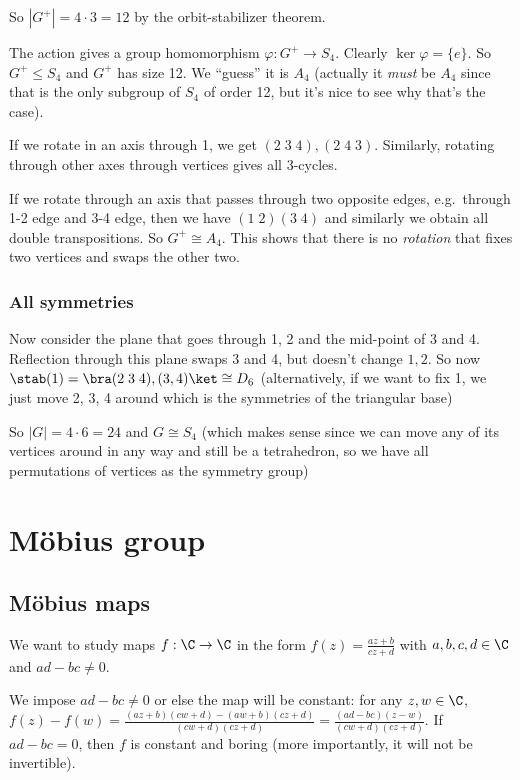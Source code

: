 \documentclass[a4paper]{article}
\begin{document}
So $|G^+| = 4\cdot 3 = 12$ by the orbit-stabilizer theorem.

The action gives a group homomorphism $\varphi: G^+ \to S_4$. Clearly $\ker \varphi = \{e\}$. So $G^+ \leq S_4$ and $G^+$ has size 12. We ``guess'' it is $A_4$ (actually it \emph{must} be $A_4$ since that is the only subgroup of $S_4$ of order 12, but it's nice to see why that's the case).

If we rotate in an axis through 1, we get $(2\; 3\; 4), (2\; 4\; 3)$. Similarly, rotating through other axes through vertices gives all 3-cycles.

If we rotate through an axis that passes through two opposite edges, e.g.\ through 1-2 edge and 3-4 edge, then we have $(1\; 2)(3\; 4)$ and similarly we obtain all double transpositions. So $G^+ \cong A_4$. This shows that there is no \emph{rotation} that fixes two vertices and swaps the other two.

\subsubsection*{All symmetries}
Now consider the plane that goes through 1, 2 and the mid-point of 3 and 4. Reflection through this plane swaps 3 and 4, but doesn't change $1, 2$. So now $\stab(1) = \bra (2\; 3\; 4), (3, 4)\ket \cong D_6$ (alternatively, if we want to fix 1, we just move 2, 3, 4 around which is the symmetries of the triangular base)

So $|G| = 4\cdot 6 = 24$ and $G\cong S_4$ (which makes sense since we can move any of its vertices around in any way and still be a tetrahedron, so we have all permutations of vertices as the symmetry group)

\section{M\texorpdfstring{\"o}{o}bius group}
\subsection{M\texorpdfstring{\"o}{o}bius maps}
We want to study maps $f: \C \to \C$ in the form $f(z) = \frac{az + b}{cz + d}$ with $a, b, c, d\in \C$ and $ad - bc \not= 0$.

We impose $ad - bc\not= 0$ or else the map will be constant: for any $z, w\in \C$, $f(z) - f(w) = \frac{(az + b)(cw + d) - (aw + b)(cz + d)}{(cw + d)(cz + d)} = \frac{(ad - bc)(z - w)}{(cw + d)(cz + d)}$. If $ad - bc = 0$, then $f$ is constant and boring (more importantly, it will not be invertible).
\end{document}
